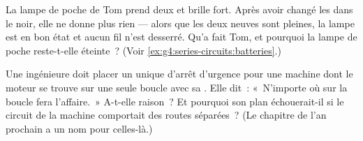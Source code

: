 \begin{exercise}[$\star\star$]\label{exo:g4:series-circuits:10}
La lampe de poche de Tom prend deux  et brille fort. Après avoir
changé les  dans le noir, elle ne donne plus rien --- alors que
les deux  neuves sont pleines, la lampe est en bon état et aucun
fil n'est desserré. Qu'a fait Tom, et pourquoi la lampe de poche
reste-t-elle éteinte~? (Voir \cref{ex:g4:series-circuits:batteries}.)
\end{exercise}

\begin{exercise}[$\star\star$]\label{exo:g4:series-circuits:11}
Une ingénieure doit placer un unique  d'arrêt d'urgence
pour une machine dont le moteur se trouve sur une seule boucle avec
sa . Elle dit~: «~N'importe où sur la boucle fera l'affaire.~»
A-t-elle raison~? Et pourquoi son plan échouerait-il si le circuit de
la machine comportait des routes séparées~? (Le chapitre de l'an
prochain a un nom pour celles-là.)
\end{exercise}
